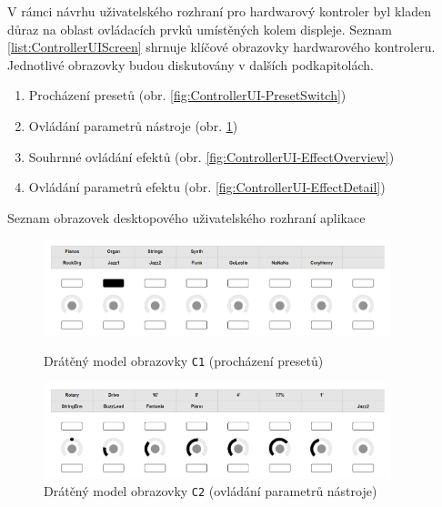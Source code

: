 \documentclass[thesis=M,czech]{FITthesis}[2019/03/06]
\begin{document}
		V rámci návrhu uživatelského rozhraní pro hardwarový kontroler byl kladen důraz na oblast ovládacích prvků umístěných kolem displeje.
	 	Seznam \ref{list:ControllerUIScreen} shrnuje klíčové obrazovky hardwarového kontroleru. Jednotlivé obrazovky budou diskutovány
	 	v dalších podkapitolách.
		\begin{mylist}
			\begin{enumerate}[label=\textbf{C\arabic*.}]
				\item Procházení presetů (obr. \ref{fig:ControllerUI-PresetSwitch})
				\item Ovládání parametrů nástroje (obr. \ref{fig:ControllerUI-PresetDetail})
				\item Souhrnné ovládání efektů  (obr. \ref{fig:ControllerUI-EffectOverview})
				\item Ovládání parametrů efektu (obr. \ref{fig:ControllerUI-EffectDetail})
			\end{enumerate}
			\caption{Seznam obrazovek desktopového uživatelského rozhraní aplikace}\label{list:ControllerUIScreen}		
		\end{mylist}
		
		\begin{figure}
			\centering
			\includegraphics[width=0.9\textwidth]{ControllerUI-PresetSwitch}
			\caption{Drátěný model obrazovky \texttt{C1} (procházení presetů)}
			\label{fig:ControllerUI-PresetSwitch}			
			\vspace{1.2cm}
			\includegraphics[width=0.9\textwidth]{ControllerUI-PresetDetail}
			\caption{Drátěný model obrazovky \texttt{C2} (ovládání parametrů nástroje)}
			\label{fig:ControllerUI-PresetDetail}
		\end{figure}
		
\end{document}
